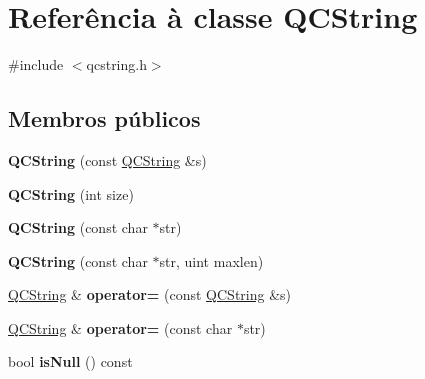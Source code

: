 \hypertarget{class_q_c_string}{\section{Referência à classe Q\-C\-String}
\label{class_q_c_string}
}


{\ttfamily \#include $<$qcstring.\-h$>$}

\subsection*{Membros públicos}
\begin{DoxyCompactItemize}
\item 
\hypertarget{class_q_c_string_ab387483d332ee93a3eaea7c962bb6e3f}{{\bfseries Q\-C\-String} (const \hyperlink{class_q_c_string}{Q\-C\-String} \&s)}\label{class_q_c_string_ab387483d332ee93a3eaea7c962bb6e3f}

\item 
\hypertarget{class_q_c_string_acb2022187ed4b496e2a5f7051a21b05e}{{\bfseries Q\-C\-String} (int size)}\label{class_q_c_string_acb2022187ed4b496e2a5f7051a21b05e}

\item 
\hypertarget{class_q_c_string_a357badc0e7b25f6151ac77c5992ea584}{{\bfseries Q\-C\-String} (const char $\ast$str)}\label{class_q_c_string_a357badc0e7b25f6151ac77c5992ea584}

\item 
\hypertarget{class_q_c_string_adee7db39efdfaa30e350a33cc002f9aa}{{\bfseries Q\-C\-String} (const char $\ast$str, uint maxlen)}\label{class_q_c_string_adee7db39efdfaa30e350a33cc002f9aa}

\item 
\hypertarget{class_q_c_string_a940233238a46c397431e110bf8648412}{\hyperlink{class_q_c_string}{Q\-C\-String} \& {\bfseries operator=} (const \hyperlink{class_q_c_string}{Q\-C\-String} \&s)}\label{class_q_c_string_a940233238a46c397431e110bf8648412}

\item 
\hypertarget{class_q_c_string_a0b7113141ec01d61c97d1e5ef3152a53}{\hyperlink{class_q_c_string}{Q\-C\-String} \& {\bfseries operator=} (const char $\ast$str)}\label{class_q_c_string_a0b7113141ec01d61c97d1e5ef3152a53}

\item 
\hypertarget{class_q_c_string_ac02f2a4d7312eb91f40980adfd4e31b2}{bool {\bfseries is\-Null} () const }\label{class_q_c_string_ac02f2a4d7312eb91f40980adfd4e31b2}


\end{DoxyCompactItemize}

